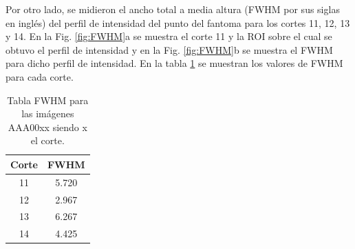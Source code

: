 \documentclass[11pt,twocolumn,twoside]{opticajnl}
\begin{document}
Por otro lado, se midieron el ancho total a media altura (FWHM por sus siglas en inglés) del perfil de intensidad del punto del fantoma para los cortes 11, 12, 13 y 14. En la Fig. \ref{fig:FWHM}a se muestra el corte 11 y la ROI sobre el cual se obtuvo el perfil de intensidad y en la Fig. \ref{fig:FWHM}b se muestra el FWHM para dicho perfil de intensidad. En la tabla \ref{tab:FWHM} se muestran los valores de FWHM para cada corte.

\begin{table}[h]
    \centering
    \begin{tabular}{c||c}
    \hline
    Corte & FWHM  \\ \hline
    11    & 5.720   \\ \hline
    12    & 2.967   \\ \hline
    13    & 6.267   \\ \hline
    14    & 4.425   \\ \hline
    \end{tabular}
    \caption{Tabla FWHM para las imágenes AAA00xx siendo x el corte.} 
    \label{tab:FWHM}
\end{table}
\end{document}
